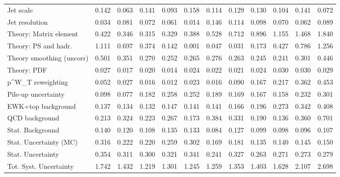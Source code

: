 \begin{tabular}{l|p{0.6cm}p{0.6cm}p{0.6cm}p{0.6cm}p{0.6cm}p{0.6cm}p{0.6cm}p{0.6cm}p{0.6cm}p{0.6cm}p{0.6cm}}
Jet scale                                & 0.142 & 0.063 & 0.141 & 0.093 & 0.158 & 0.114 & 0.129 & 0.130 & 0.104 & 0.141 & 0.072 \\
Jet resolution                           & 0.034 & 0.081 & 0.072 & 0.061 & 0.014 & 0.146 & 0.114 & 0.098 & 0.070 & 0.062 & 0.089 \\
Theory: Matrix element                   & 0.422 & 0.346 & 0.315 & 0.329 & 0.388 & 0.528 & 0.712 & 0.896 & 1.155 & 1.468 & 1.840 \\
Theory: PS and hadr.                     & 1.111 & 0.697 & 0.374 & 0.142 & 0.001 & 0.047 & 0.031 & 0.173 & 0.427 & 0.786 & 1.256 \\
Theory smoothing (uncorr)                & 0.501 & 0.351 & 0.270 & 0.252 & 0.265 & 0.276 & 0.263 & 0.245 & 0.241 & 0.301 & 0.446 \\
Theory: PDF                              & 0.027 & 0.017 & 0.020 & 0.014 & 0.024 & 0.022 & 0.021 & 0.024 & 0.030 & 0.030 & 0.029 \\
p^{W}_{T} reweighting                    & 0.052 & 0.027 & 0.016 & 0.012 & 0.023 & 0.016 & 0.090 & 0.167 & 0.217 & 0.362 & 0.453 \\
Pile-up uncertainty                      & 0.098 & 0.077 & 0.182 & 0.258 & 0.252 & 0.189 & 0.169 & 0.167 & 0.158 & 0.232 & 0.301 \\
EWK+top background                       & 0.137 & 0.134 & 0.132 & 0.147 & 0.141 & 0.141 & 0.166 & 0.196 & 0.273 & 0.342 & 0.408 \\
QCD background                           & 0.213 & 0.324 & 0.223 & 0.267 & 0.173 & 0.384 & 0.331 & 0.190 & 0.136 & 0.360 & 0.701 \\
Stat. Background                         & 0.140 & 0.120 & 0.108 & 0.135 & 0.133 & 0.084 & 0.127 & 0.099 & 0.098 & 0.096 & 0.107 \\
Stat. Uncertainty (MC)                   & 0.316 & 0.222 & 0.220 & 0.259 & 0.302 & 0.169 & 0.181 & 0.135 & 0.140 & 0.145 & 0.150 \\
\hline
Stat. Uncertainty                        & 0.354 & 0.311 & 0.300 & 0.321 & 0.341 & 0.241 & 0.327 & 0.263 & 0.271 & 0.273 & 0.279 \\
\hline
Tot. Syst. Uncertainty                   & 1.742 & 1.432 & 1.219 & 1.301 & 1.245 & 1.259 & 1.353 & 1.403 & 1.628 & 2.107 & 2.698 \\
\hline
\end{tabular}
